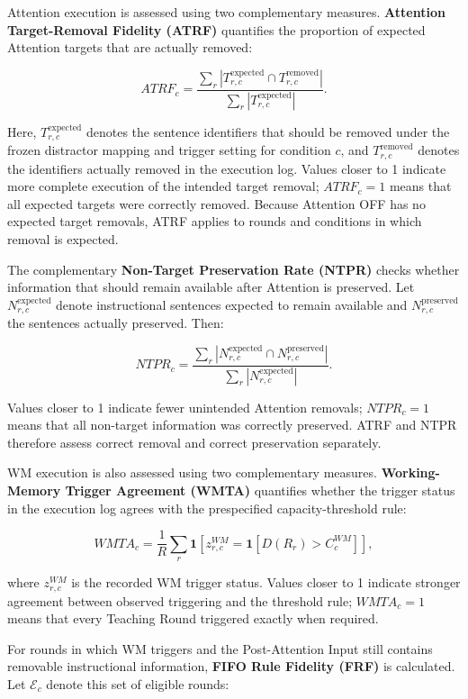 Attention execution is assessed using two complementary measures. \textbf{Attention Target-Removal Fidelity (ATRF)} quantifies the proportion of expected Attention targets that are actually removed:

\[
ATRF_c=
\frac{
\sum_r
\left|
T^{\mathrm{expected}}_{r,c}
\cap
T^{\mathrm{removed}}_{r,c}
\right|
}{
\sum_r
\left|
T^{\mathrm{expected}}_{r,c}
\right|
}.
\]

Here, $T^{\mathrm{expected}}_{r,c}$ denotes the sentence identifiers that should be removed under the frozen distractor mapping and trigger setting for condition $c$, and $T^{\mathrm{removed}}_{r,c}$ denotes the identifiers actually removed in the execution log. Values closer to 1 indicate more complete execution of the intended target removal; $ATRF_c=1$ means that all expected targets were correctly removed. Because Attention OFF has no expected target removals, ATRF applies to rounds and conditions in which removal is expected.

The complementary \textbf{Non-Target Preservation Rate (NTPR)} checks whether information that should remain available after Attention is preserved. Let $N^{\mathrm{expected}}_{r,c}$ denote instructional sentences expected to remain available and $N^{\mathrm{preserved}}_{r,c}$ the sentences actually preserved. Then:

\[
NTPR_c=
\frac{
\sum_r
\left|
N^{\mathrm{expected}}_{r,c}
\cap
N^{\mathrm{preserved}}_{r,c}
\right|
}{
\sum_r
\left|
N^{\mathrm{expected}}_{r,c}
\right|
}.
\]

Values closer to 1 indicate fewer unintended Attention removals; $NTPR_c=1$ means that all non-target information was correctly preserved. ATRF and NTPR therefore assess correct removal and correct preservation separately.

WM execution is also assessed using two complementary measures. \textbf{Working-Memory Trigger Agreement (WMTA)} quantifies whether the trigger status in the execution log agrees with the prespecified capacity-threshold rule:

\[
WMTA_c
=
\frac{1}{R}
\sum_r
\mathbf{1}
\left[
z^{WM}_{r,c}
=
\mathbf{1}
\left[
D(R_r)>C^{WM}_c
\right]
\right],
\]

where $z^{WM}_{r,c}$ is the recorded WM trigger status. Values closer to 1 indicate stronger agreement between observed triggering and the threshold rule; $WMTA_c=1$ means that every Teaching Round triggered exactly when required.

For rounds in which WM triggers and the Post-Attention Input still contains removable instructional information, \textbf{FIFO Rule Fidelity (FRF)} is calculated. Let $\mathcal E_c$ denote this set of eligible rounds:

